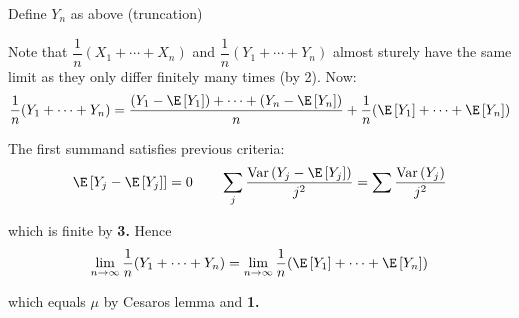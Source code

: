 \begin{prf}[]{}
  Define $Y_n$ as above (truncation)\par
  \noindent Note that $\dfrac{1}{n}(X_1+\cdots+X_n)$ and $\dfrac{1}{n}(Y_1+\cdots+Y_n)$ almost sturely have the same limit as they only differ finitely many times (by 2). Now:
  \begin{equation*}
    \begin{gathered}
      \dfrac{1}{n}(Y_1+\cdots+Y_n) = \dfrac{(Y_1-\E\left[Y_1\right])+\cdots+(Y_n-\E\left[Y_n\right])}{n} + \dfrac{1}{n}(\E\left[Y_1\right]+\cdots+\E\left[Y_n\right])
    \end{gathered}
  \end{equation*}\par
  \noindent The first summand satisfies previous criteria:
  \begin{equation*}
    \begin{gathered}
      \E\left[Y_j-\E\left[Y_j\right]\right] = 0\qquad\sum_j\dfrac{\text{Var}\left(Y_j-\E\left[Y_j\right]\right)}{j^2}= \sum\dfrac{\text{Var}\left(Y_j\right)}{j^2}
    \end{gathered}
  \end{equation*}\par
  \noindent which is finite by \textbf{3.} Hence
  \begin{equation*}
    \begin{gathered}
      \lim_{n\to\infty}\dfrac{1}{n}(Y_1+\cdots+Y_n) = \lim_{n\to\infty}\dfrac{1}{n}(\E\left[Y_1\right]+\cdots+\E\left[Y_n\right])
    \end{gathered}
  \end{equation*}\par
  \noindent which equals $\mu$ by Cesaros lemma and \textbf{1.}
\end{prf}
